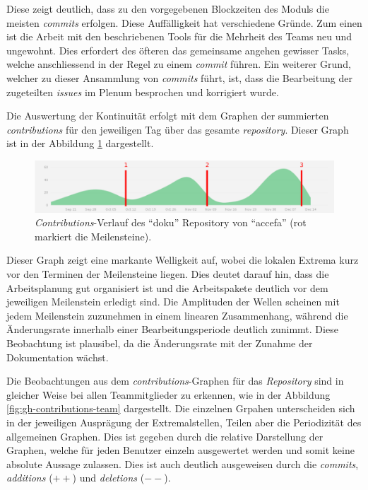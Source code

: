 Diese zeigt deutlich, dass zu den vorgegebenen Blockzeiten des Moduls
die meisten \emph{commits} erfolgen. Diese Auffälligkeit hat verschiedene
Gründe. Zum einen ist die Arbeit mit den beschriebenen Tools für die
Mehrheit des Teams neu und ungewohnt. Dies erfordert des öfteren das
gemeinsame angehen gewisser Tasks, welche anschliessend in der Regel zu
einem \emph{commit} führen. Ein weiterer Grund, welcher zu dieser
Ansammlung von \emph{commits} führt, ist, dass die Bearbeitung der
zugeteilten \emph{issues} im Plenum besprochen und korrigiert wurde.

Die Auswertung der Kontinuität erfolgt mit dem Graphen der summierten
\emph{contributions} für den jeweiligen Tag über das gesamte
\emph{repository}. Dieser Graph ist in der Abbildung 
\ref{fig:gh-contributions-ov} dargestellt.

\begin{figure}[h!]
	\centering
	\includegraphics[width=1\textwidth]{../../fig/pm/gh-contributions-ov_marked.pdf}
	\caption{\emph{Contributions}-Verlauf des ``doku'' Repository
		von ``accefa'' (rot markiert die Meilensteine).}
	\label{fig:gh-contributions-ov}
\end{figure}

Dieser Graph zeigt eine markante Welligkeit auf, wobei die lokalen Extrema
kurz vor den Terminen der Meilensteine liegen. Dies deutet darauf hin, dass
die Arbeitsplanung gut organisiert ist und die Arbeitspakete deutlich vor
dem jeweiligen Meilenstein erledigt sind. Die Amplituden der Wellen
scheinen mit jedem Meilenstein zuzunehmen in einem linearen Zusammenhang,
während die Änderungsrate innerhalb einer Bearbeitungsperiode deutlich zunimmt.
Diese Beobachtung ist plausibel, da die Änderungsrate mit der Zunahme der
Dokumentation wächst.

Die Beobachtungen aus dem \emph{contributions}-Graphen für das
\emph{Repository} sind in gleicher Weise bei allen Teammitglieder zu erkennen,
wie in der Abbildung \ref{fig:gh-contributions-team} dargestellt. Die einzelnen
Grpahen unterscheiden sich in der jeweiligen Ausprägung der Extremalstellen,
Teilen aber die Periodizität des allgemeinen Graphen. Dies ist gegeben durch
die relative Darstellung der Graphen, welche für jeden Benutzer einzeln
ausgewertet werden und somit keine absolute Aussage zulassen. Dies ist auch
deutlich ausgeweisen durch die \emph{commits}, \emph{additions} ($++$) und
\emph{deletions} ($--$).

